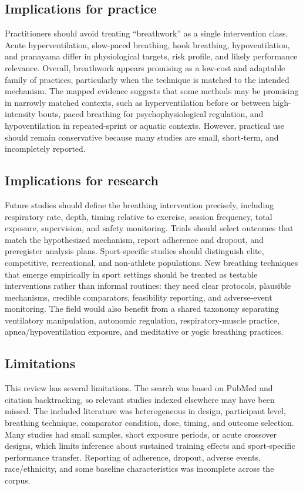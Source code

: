 \documentclass[11pt,a4paper]{article}
\begin{document}
\subsection{Implications for practice}
Practitioners should avoid treating ``breathwork'' as a single intervention class. Acute hyperventilation, slow-paced breathing, hook breathing, hypoventilation, and pranayama differ in physiological targets, risk profile, and likely performance relevance. Overall, breathwork appears promising as a low-cost and adaptable family of practices, particularly when the technique is matched to the intended mechanism. The mapped evidence suggests that some methods may be promising in narrowly matched contexts, such as hyperventilation before or between high-intensity bouts, paced breathing for psychophysiological regulation, and hypoventilation in repeated-sprint or aquatic contexts. However, practical use should remain conservative because many studies are small, short-term, and incompletely reported.

\subsection{Implications for research}
Future studies should define the breathing intervention precisely, including respiratory rate, depth, timing relative to exercise, session frequency, total exposure, supervision, and safety monitoring. Trials should select outcomes that match the hypothesized mechanism, report adherence and dropout, and preregister analysis plans. Sport-specific studies should distinguish elite, competitive, recreational, and non-athlete populations. New breathing techniques that emerge empirically in sport settings should be treated as testable interventions rather than informal routines: they need clear protocols, plausible mechanisms, credible comparators, feasibility reporting, and adverse-event monitoring. The field would also benefit from a shared taxonomy separating ventilatory manipulation, autonomic regulation, respiratory-muscle practice, apnea/hypoventilation exposure, and meditative or yogic breathing practices.

\subsection{Limitations}
This review has several limitations. The search was based on PubMed and citation backtracking, so relevant studies indexed elsewhere may have been missed. The included literature was heterogeneous in design, participant level, breathing technique, comparator condition, dose, timing, and outcome selection. Many studies had small samples, short exposure periods, or acute crossover designs, which limits inference about sustained training effects and sport-specific performance transfer. Reporting of adherence, dropout, adverse events, race/ethnicity, and some baseline characteristics was incomplete across the corpus.
\end{document}

